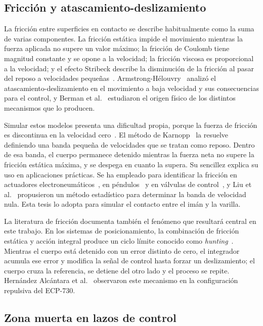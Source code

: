 \subsection{Fricción y atascamiento-deslizamiento}

La fricción entre superficies en contacto se describe habitualmente como la suma de varias componentes. La fricción estática impide el movimiento mientras la fuerza aplicada no supere un valor máximo; la fricción de Coulomb tiene magnitud constante y se opone a la velocidad; la fricción viscosa es proporcional a la velocidad; y el efecto Stribeck describe la disminución de la fricción al pasar del reposo a velocidades pequeñas~\cite{olsson,armstrong}. Armstrong-Hélouvry~\cite{armstrong} analizó el atascamiento-deslizamiento en el movimiento a baja velocidad y sus consecuencias para el control, y Berman et al.~\cite{berman} estudiaron el origen físico de los distintos mecanismos que lo producen.

Simular estos modelos presenta una dificultad propia, porque la fuerza de fricción es discontinua en la velocidad cero~\cite{haessig}. El método de Karnopp~\cite{karnopp} la resuelve definiendo una banda pequeña de velocidades que se tratan como reposo. Dentro de esa banda, el cuerpo permanece detenido mientras la fuerza neta no supere la fricción estática máxima, y se despega en cuanto la supera. Su sencillez explica su uso en aplicaciones prácticas. Se ha empleado para identificar la fricción en actuadores electroneumáticos~\cite{ravanbod,ravanbod1}, en péndulos~\cite{bicakci} y en válvulas de control~\cite{romano}, y Liu et al.~\cite{liu} propusieron un método estadístico para determinar la banda de velocidad nula. Esta tesis lo adopta para simular el contacto entre el imán y la varilla.

La literatura de fricción documenta también el fenómeno que resultará central en este trabajo. En los sistemas de posicionamiento, la combinación de fricción estática y acción integral produce un ciclo límite conocido como \emph{hunting}~\cite{olsson,armstrong}. Mientras el cuerpo está detenido con un error distinto de cero, el integrador acumula ese error y modifica la señal de control hasta forzar un deslizamiento; el cuerpo cruza la referencia, se detiene del otro lado y el proceso se repite. Hernández Alcántara et al.~\cite{alcantara} observaron este mecanismo en la configuración repulsiva del ECP-730.

\subsection{Zona muerta en lazos de control}

